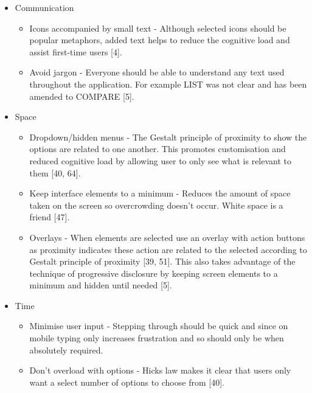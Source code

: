 \documentclass[a4 paper, 12pt]{article}
\begin{document}
\begin{itemize}
            \item Communication 
            \begin{itemize}
                \item Icons accompanied by small text - Although selected icons should be popular metaphors, added text helps to reduce the cognitive load and assist first-time users [4].
                \item Avoid jargon - Everyone should be able to understand any text used throughout the application. For example LIST was not clear and has been amended to COMPARE [5].
            \end{itemize}
            
            \item Space 
                \begin{itemize}
                    \item Dropdown/hidden menus - The Gestalt principle of proximity to show the options are related to one another. This promotes customisation and reduced cognitive load by allowing user to only see what is relevant to them [40, 64].
                    \item Keep interface elements to a minimum - Reduces the amount of space taken on the screen so overcrowding doesn't occur. White space is a friend [47].
                    \item Overlays - When elements are selected use an overlay with action buttons as proximity indicates these action are related to the selected according to Gestalt principle of proximity [39, 51]. This also takes advantage of the technique of progressive disclosure by keeping screen elements to a minimum and hidden until needed [5].
                \end{itemize}
            \item Time
                \begin{itemize}
                    \item Minimise user input - Stepping through should be quick and since on mobile typing only increases frustration and so should only be when absolutely required.
                    \item Don't overload with options - Hicks law makes it clear that users only want a select number of options to choose from [40].
                \end{itemize}
                   
           \end{itemize}    
\end{document}
